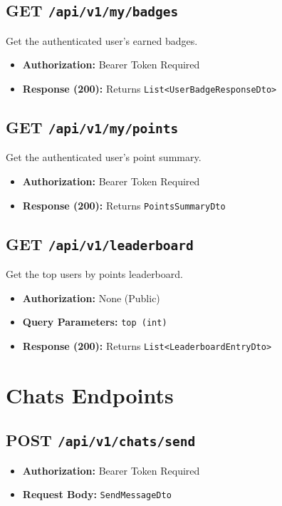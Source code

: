 \subsection{GET \texttt{/api/v1/my/badges}}
Get the authenticated user's earned badges.
\begin{itemize}
    \item \textbf{Authorization:} Bearer Token Required
    \item \textbf{Response (200):} Returns \texttt{List<UserBadgeResponseDto>}
\end{itemize}

\subsection{GET \texttt{/api/v1/my/points}}
Get the authenticated user's point summary.
\begin{itemize}
    \item \textbf{Authorization:} Bearer Token Required
    \item \textbf{Response (200):} Returns \texttt{PointsSummaryDto}
\end{itemize}

\subsection{GET \texttt{/api/v1/leaderboard}}
Get the top users by points leaderboard.
\begin{itemize}
    \item \textbf{Authorization:} None (Public)
    \item \textbf{Query Parameters:} \texttt{top (int)}
    \item \textbf{Response (200):} Returns \texttt{List<LeaderboardEntryDto>}
\end{itemize}

\section{Chats Endpoints}

\subsection{POST \texttt{/api/v1/chats/send}}
\begin{itemize}
    \item \textbf{Authorization:} Bearer Token Required
    \item \textbf{Request Body:} \texttt{SendMessageDto}
\end{itemize}

